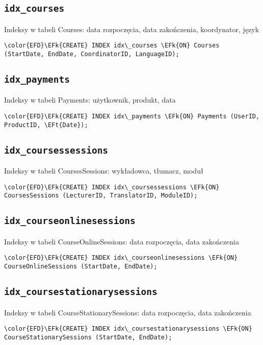 \documentclass[11pt]{article}
\newcommand{\EFk}[1]{\textcolor{EFk}{\textbf{#1}}} %
\newcommand{\EFt}[1]{\textcolor{EFt}{\textbf{#1}}} %
\begin{document}
\subsection{\texttt{idx\_courses}}
\label{sec:orgaff4acc}
Indeksy w tabeli Courses: data rozpoczęcia, data zakończenia, koordynator, język
\begin{Code}
\begin{Verbatim}
\color{EFD}\EFk{CREATE} INDEX idx\_courses \EFk{ON} Courses (StartDate, EndDate, CoordinatorID, LanguageID);
\end{Verbatim}
\end{Code}
\subsection{\texttt{idx\_payments}}
\label{sec:orgee970a3}
Indeksy w tabeli Payments: użytkownik, produkt, data
\begin{Code}
\begin{Verbatim}
\color{EFD}\EFk{CREATE} INDEX idx\_payments \EFk{ON} Payments (UserID, ProductID, \EFt{Date});
\end{Verbatim}
\end{Code}
\subsection{\texttt{idx\_coursessessions}}
\label{sec:orgf22b259}
Indeksy w tabeli CoursesSessions: wykładowca, tłumacz, moduł
\begin{Code}
\begin{Verbatim}
\color{EFD}\EFk{CREATE} INDEX idx\_coursessessions \EFk{ON} CoursesSessions (LecturerID, TranslatorID, ModuleID);
\end{Verbatim}
\end{Code}
\subsection{\texttt{idx\_courseonlinesessions}}
\label{sec:org4cdb64d}
Indeksy w tabeli CourseOnlineSessions: data rozpoczęcia, data zakończenia
\begin{Code}
\begin{Verbatim}
\color{EFD}\EFk{CREATE} INDEX idx\_courseonlinesessions \EFk{ON} CourseOnlineSessions (StartDate, EndDate);
\end{Verbatim}
\end{Code}
\subsection{\texttt{idx\_coursestationarysessions}}
\label{sec:orgcca0112}
Indeksy w tabeli CourseStationarySessions: data rozpoczęcia, data zakończenia
\begin{Code}
\begin{Verbatim}
\color{EFD}\EFk{CREATE} INDEX idx\_coursestationarysessions \EFk{ON} CourseStationarySessions (StartDate, EndDate);
\end{Verbatim}
\end{Code}
\end{document}
